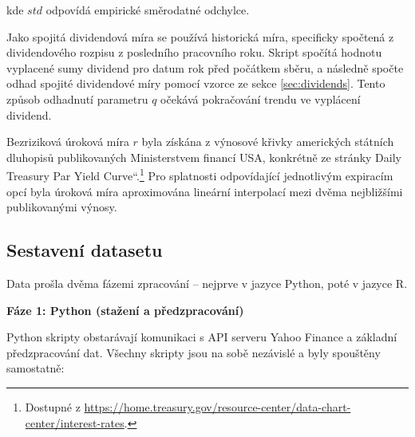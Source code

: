\documentclass[male,czech,api_bc]{kitheses}
\newcommand{\UV}[1]{\quotedblbase#1\textquotedblleft}
\begin{document}
  kde $std$ odpovídá empirické směrodatné odchylce.

  \label{sec:hist_vol}
  Jako spojitá dividendová míra se používá historická míra, specificky spočtená z dividendového rozpisu z posledního pracovního roku. Skript spočítá hodnotu vyplacené sumy dividend pro datum rok před počátkem sběru, a následně spočte odhad spojité dividendové míry pomocí vzorce ze sekce \ref{sec:dividends}. Tento způsob odhadnutí parametru $q$ očekává pokračování trendu ve vyplácení dividend.

  Bezriziková úroková míra \(r\) byla získána z výnosové křivky amerických státních dluhopisů publikovaných Ministerstvem financí USA, konkrétně ze stránky \UV{Daily Treasury Par Yield Curve}.\footnote{Dostupné z \url{https://home.treasury.gov/resource-center/data-chart-center/interest-rates}.} Pro splatnosti odpovídající jednotlivým expiracím opcí byla úroková míra aproximována lineární interpolací mezi dvěma nejbližšími publikovanými výnosy.

  \subsection{Sestavení datasetu}

  Data prošla dvěma fázemi zpracování – nejprve v jazyce Python, poté v jazyce R.

  \bigskip
  \noindent\textbf{Fáze 1: Python (stažení a předzpracování)}

  Python skripty obstarávají komunikaci s API serveru Yahoo Finance a základní předzpracování dat. Všechny skripty jsou na sobě nezávislé a byly spouštěny samostatně:
\end{document}
